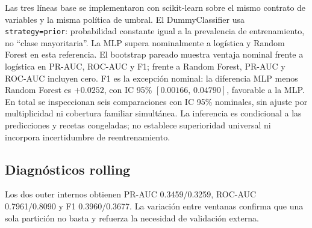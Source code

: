 Las tres líneas base se implementaron con scikit-learn \cite{pedregosa_scikit_2011} sobre el mismo contrato de variables y la misma política de umbral. El DummyClassifier usa \texttt{strategy=prior}: probabilidad constante igual a la prevalencia de entrenamiento, no ``clase mayoritaria''. La MLP supera nominalmente a logística y Random Forest en esta referencia. El bootstrap pareado muestra ventaja nominal frente a logística en PR-AUC, ROC-AUC y F1; frente a Random Forest, PR-AUC y ROC-AUC incluyen cero. F1 es la excepción nominal: la diferencia MLP menos Random Forest es $+0.0252$, con IC 95\% $[0.00166,\,0.04790]$, favorable a la MLP. En total se inspeccionan seis comparaciones con IC 95\% nominales, sin ajuste por multiplicidad ni cobertura familiar simultánea. La inferencia es condicional a las predicciones y recetas congeladas; no establece superioridad universal ni incorpora incertidumbre de reentrenamiento.

\subsection{Diagnósticos rolling}
Los dos outer internos obtienen PR-AUC 0.3459/0.3259, ROC-AUC 0.7961/0.8090 y F1 0.3960/0.3677. La variación entre ventanas confirma que una sola partición no basta y refuerza la necesidad de validación externa.
